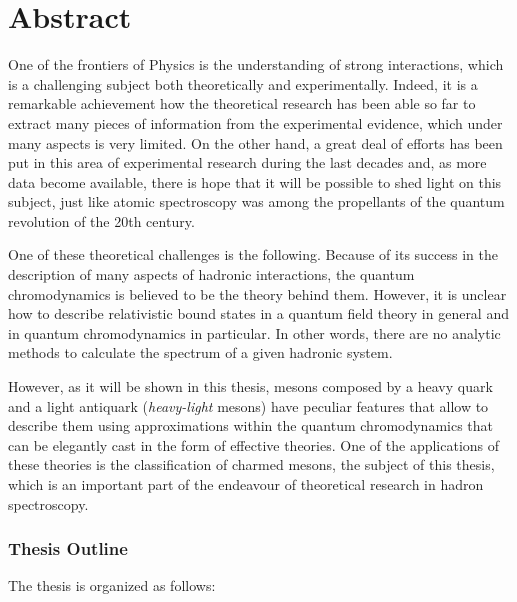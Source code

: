 \chapter{Abstract}

One of the frontiers of Physics is the understanding of strong interactions, which is a challenging subject both theoretically and experimentally. Indeed, it is a remarkable achievement how the theoretical research has been able so far to extract many pieces of information from the experimental evidence, which under many aspects is very limited. On the other hand, a great deal of efforts has been put in this area of experimental research during the last decades and, as more data become available, there is hope that it will be possible to shed light on this subject, just like atomic spectroscopy was among the propellants of the quantum revolution of the 20th century.

One of these theoretical challenges is the following. Because of its success in the description of many aspects of hadronic interactions, the quantum chromodynamics is believed to be the theory behind them. However, it is unclear how to describe relativistic bound states in a quantum field theory in general and in quantum chromodynamics in particular. In other words, there are no analytic methods to calculate the spectrum of a given hadronic system.

However, as it will be shown in this thesis, mesons composed by a heavy quark and a light antiquark (\emph{heavy-light} mesons) have peculiar features that allow to describe them using approximations within the quantum chromodynamics that can be elegantly cast in the form of effective theories. One of the applications of these theories is the classification of charmed mesons, the subject of this thesis, which is an important part of the endeavour of theoretical research in hadron spectroscopy. 

\subsection{Thesis Outline}

The thesis is organized as follows:

